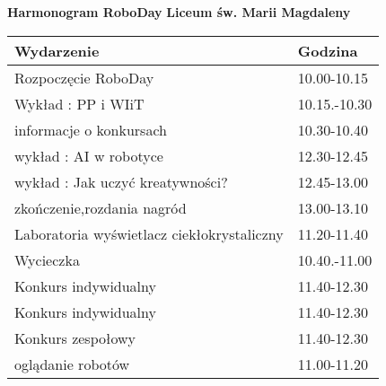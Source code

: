 \documentclass{article}
\begin{document}
\begin{center}
\Large\textbf{Harmonogram RoboDay}
\large\textbf{Liceum św. Marii Magdaleny}
\end{center}
\vspace{1cm}
\begin{center}
\begin{tabular}{|l|l|}
\hline
\textbf{Wydarzenie} & \textbf{Godzina} \\
\hline
Rozpoczęcie RoboDay & 10.00-10.15 \\
\hline
Wykład : PP i WIiT & 10.15.-10.30 \\
\hline
informacje o konkursach & 10.30-10.40 \\
\hline
wykład : AI w robotyce & 12.30-12.45 \\
\hline
wykład : Jak uczyć kreatywności? & 12.45-13.00 \\
\hline
zkończenie,rozdania nagród & 13.00-13.10 \\
\hline
Laboratoria wyświetlacz ciekłokrystaliczny & 11.20-11.40 \\
\hline
Wycieczka & 10.40.-11.00 \\
\hline
Konkurs indywidualny & 11.40-12.30 \\
\hline
Konkurs indywidualny & 11.40-12.30 \\
\hline
Konkurs zespołowy & 11.40-12.30 \\
\hline
oglądanie robotów & 11.00-11.20 \\
\hline
\end{tabular}
\end{center}
\end{document}
